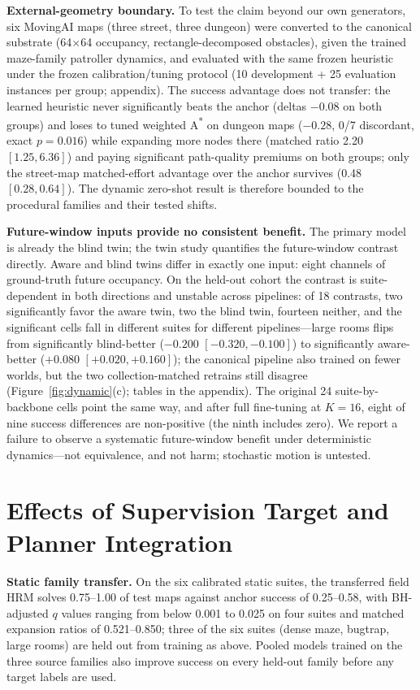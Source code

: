\documentclass[letterpaper]{article} %
\begin{document}
\textbf{External-geometry boundary.} To test the claim beyond our own generators, six MovingAI maps \citep{sturtevant2012movingai} (three street, three dungeon) were converted to the canonical substrate (64$\times$64 occupancy, rectangle-decomposed obstacles), given the trained maze-family patroller dynamics, and evaluated with the same frozen heuristic under the frozen calibration/tuning protocol (10 development + 25 evaluation instances per group; appendix). The success advantage does not transfer: the learned heuristic never significantly beats the anchor (deltas $-0.08$ on both groups) and loses to tuned weighted A\textsuperscript{*} on dungeon maps ($-0.28$, 0/7 discordant, exact $p{=}0.016$) while expanding more nodes there (matched ratio 2.20 $[1.25, 6.36]$) and paying significant path-quality premiums on both groups; only the street-map matched-effort advantage over the anchor survives (0.48 $[0.28, 0.64]$). The dynamic zero-shot result is therefore bounded to the procedural families and their tested shifts.

\textbf{Future-window inputs provide no consistent benefit.} The primary model is already the blind twin; the twin study quantifies the future-window contrast directly. Aware and blind twins differ in exactly one input: eight channels of ground-truth future occupancy. On the held-out cohort the contrast is suite-dependent in both directions and unstable across pipelines: of 18 contrasts, two significantly favor the aware twin, two the blind twin, fourteen neither, and the significant cells fall in different suites for different pipelines---large rooms flips from significantly blind-better ($-0.200$ $[-0.320,-0.100]$) to significantly aware-better ($+0.080$ $[+0.020,+0.160]$); the canonical pipeline also trained on fewer worlds, but the two collection-matched retrains still disagree (Figure~\ref{fig:dynamic}(c); tables in the appendix). The original 24 suite-by-backbone cells point the same way, and after full fine-tuning at $K{=}16$, eight of nine success differences are non-positive (the ninth includes zero). We report a failure to observe a systematic future-window benefit under deterministic dynamics---not equivalence, and not harm; stochastic motion is untested.

\section{Effects of Supervision Target and Planner Integration}

\textbf{Static family transfer.} On the six calibrated static suites, the transferred field HRM solves 0.75--1.00 of test maps against anchor success of 0.25--0.58, with BH-adjusted $q$ values ranging from below 0.001 to 0.025 on four suites and matched expansion ratios of 0.521--0.850; three of the six suites (dense maze, bugtrap, large rooms) are held out from training as above. Pooled models trained on the three source families also improve success on every held-out family before any target labels are used.
\end{document}
